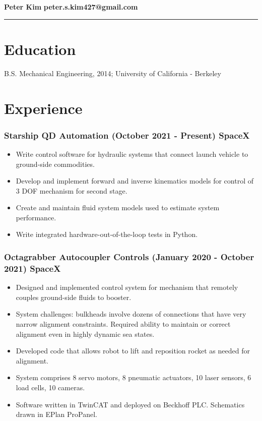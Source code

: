\documentclass[11pt]{article}
\begin{document}
\thispagestyle{empty}
\noindent
{\Huge \textbf{Peter Kim}} \hfill \textbf{peter.s.kim427@gmail.com}
\vspace{3pt}
\hrule

\section*{Education}
B.S. Mechanical Engineering, 2014; University of California - Berkeley

\section*{Experience}
    \subsubsection*{Starship QD Automation
                    (October 2021 - Present) \hfill SpaceX}
        \begin{itemize}
            \setlength\itemsep{-0.5em}
            \item Write control software for hydraulic systems that
                  connect launch vehicle to ground-side commodities.
            \item Develop and implement forward and inverse kinematics 
                  models for control of 3 DOF mechanism for second 
                  stage.
            \item Create and maintain fluid system models used to estimate
                  system performance.
            \item Write integrated hardware-out-of-the-loop tests in 
                  Python.
            
        \end{itemize}
        
    \subsubsection*{Octagrabber Autocoupler Controls 
                    (January 2020 - October 2021) \hfill SpaceX}
        \begin{itemize}
            \setlength\itemsep{-0.5em}
            \item Designed and implemented control system for mechanism that
                  remotely couples ground-side fluids to 
                  booster.
            \item System challenges: bulkheads involve dozens of 
                  connections that have very narrow alignment constraints.
                  Required ability to maintain or correct alignment
                  even in highly dynamic sea states.
            \item Developed code that allows robot to lift and
                  reposition rocket as needed for alignment.
            \item System comprises 8 servo motors, 8 pneumatic actuators,
                  10 laser sensors, 6 load cells, 10 cameras.
            \item Software written in TwinCAT and deployed on Beckhoff PLC. 
                  Schematics drawn in EPlan ProPanel.
        \end{itemize}
\end{document}
